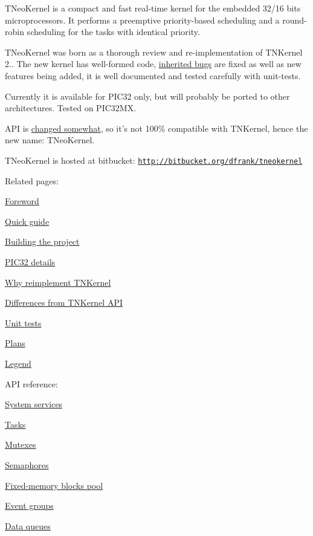 T\+Neo\+Kernel is a compact and fast real-\/time kernel for the embedded 32/16 bits microprocessors. It performs a preemptive priority-\/based scheduling and a round-\/robin scheduling for the tasks with identical priority.

T\+Neo\+Kernel was born as a thorough review and re-\/implementation of T\+N\+Kernel 2.. The new kernel has well-\/formed code, \hyperlink{why_reimplement_why_reimplement__bugs}{inherited bugs} are fixed as well as new features being added, it is well documented and tested carefully with unit-\/tests.

Currently it is available for P\+I\+C32 only, but will probably be ported to other architectures. Tested on P\+I\+C32\+M\+X.

A\+P\+I is \hyperlink{tnkernel_diff}{changed somewhat}, so it's not 100\% compatible with T\+N\+Kernel, hence the new name\+: T\+Neo\+Kernel.

T\+Neo\+Kernel is hosted at bitbucket\+: \href{http://bitbucket.org/dfrank/tneokernel}{\tt http\+://bitbucket.\+org/dfrank/tneokernel}

Related pages\+:


\begin{DoxyItemize}
\item \hyperlink{foreword}{Foreword}
\item \hyperlink{quick_guide}{Quick guide}
\item \hyperlink{building}{Building the project}
\item \hyperlink{pic32_details}{P\+I\+C32 details}
\item \hyperlink{why_reimplement}{Why reimplement T\+N\+Kernel}
\item \hyperlink{tnkernel_diff}{Differences from T\+N\+Kernel A\+P\+I}
\item \hyperlink{unit_tests}{Unit tests}
\item \hyperlink{plans}{Plans}
\item \hyperlink{legend}{Legend}
\end{DoxyItemize}

A\+P\+I reference\+:


\begin{DoxyItemize}
\item \hyperlink{tn__sys_8h}{System services}
\item \hyperlink{tn__tasks_8h}{Tasks}
\item \hyperlink{tn__mutex_8h}{Mutexes}
\item \hyperlink{tn__sem_8h}{Semaphores}
\item \hyperlink{tn__fmem_8h}{Fixed-\/memory blocks pool}
\item \hyperlink{tn__eventgrp_8h}{Event groups}
\item \hyperlink{tn__dqueue_8h}{Data queues} 
\end{DoxyItemize}